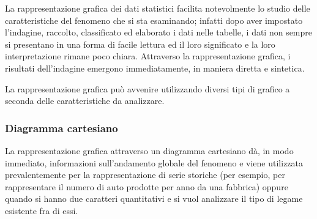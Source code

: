 La rappresentazione grafica dei dati statistici facilita notevolmente lo studio delle caratteristiche del
fenomeno che si sta esaminando; infatti dopo aver impostato l'indagine, raccolto, classificato ed elaborato i dati nelle tabelle,
i dati non sempre si presentano in una forma di facile lettura ed il loro significato e la loro interpretazione rimane poco chiara.
Attraverso la rappresentazione grafica, i risultati dell'indagine emergono immediatamente, in maniera diretta e sintetica.

La rappresentazione grafica può avvenire utilizzando diversi tipi di grafico a seconda delle caratteristiche da
analizzare.

\subsubsection{Diagramma cartesiano}
La rappresentazione grafica attraverso un diagramma cartesiano dà, in modo immediato, informazioni sull'andamento globale del fenomeno e viene
utilizzata prevalentemente per la rappresentazione di serie storiche (per esempio, per rappresentare il numero di auto prodotte per anno da una fabbrica)
oppure quando si hanno due caratteri quantitativi e si vuol analizzare il tipo di legame esistente fra di essi.


